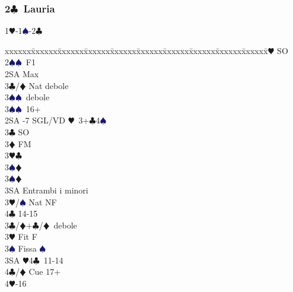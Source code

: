 \documentclass[a4paper,italian]{article}
\newcommand{\BC}{\textcolor{OliveGreen}{$\clubsuit$}}
\newcommand{\BD}{\textcolor{RedOrange}{$\vardiamondsuit$}}
\newcommand{\BH}{\textcolor{Red2}{$\varheartsuit${}}}
\newcommand{\BS}{\textcolor{MidnightBlue}{$\spadesuit${}}}
\newcommand{\pdfc}{\texorpdfstring{\BC{}}{C}}
\newenvironment{bidtable}
{\begin{tabbing}

    xxxxxx\=xxxxxx\=xxxxxx\=xxxxxx\=xxxxxx\=xxxxxx\=xxxxxx\=xxxxxx\=xxxxxx\=xxxxxx\=\kill}
{\end{tabbing} }%
\begin{document}
\begin{multicols*}{2}
                                        \subsubsection{2\pdfc\ Lauria} \label{lauria}
                                        1\BH-1\BS-2\BC
                                        \begin{bidtable}
                                            2\BH \> SO\+\\
                                            2\BS {}\BS\ F1\+\\
                                            2SA \> Max\\
                                            3\BC/\BD \> Nat debole\\
                                            3\BS {}\BS\ debole\-\\
                                            3\BS {}\BS\ 16+\-\\
                                            2SA -7 SGL/VD \BH\ 3+\BC 4\BS \+\\
                                            3\BC \> SO\\
                                            3\BD \> FM\+\\
                                            3\BH {}\BC \+\\
                                            3\BS {}\BD \-\\
                                            3\BS {}\BD \\
                                            3SA \> Entrambi i minori\-\\
                                            3\BH/\BS \> Nat NF\\
                                            4\BC {} 14-15\-\\
                                            3\BC/\BD {}+\BC /\BD\ debole\\
                                            3\BH \> Fit F\+\\
                                            3\BS \> Fissa \BS\\
                                            3SA \BH 4\BC\ 11-14\\
                                            4\BC/\BD \> Cue 17+\\
                                            4\BH {}-16\-\\

\end{bidtable}
\end{multicols*}
\end{document}
